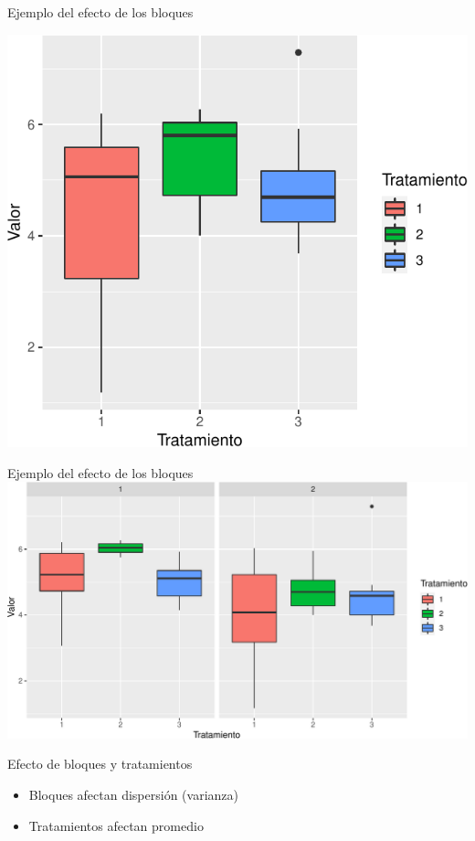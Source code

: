 \documentclass[
  11pt,
  ignorenonframetext,
]{beamer}
\begin{document}
\begin{frame}{Ejemplo del efecto de los bloques}
\protect\hypertarget{ejemplo-del-efecto-de-los-bloques}{}
\begin{center}\includegraphics{Relacion-diseno-analisis_files/figure-beamer/unnamed-chunk-1-1} \end{center}
\end{frame}

\begin{frame}{Ejemplo del efecto de los bloques}
\protect\hypertarget{ejemplo-del-efecto-de-los-bloques-1}{}
\includegraphics{Relacion-diseno-analisis_files/figure-beamer/unnamed-chunk-2-1.pdf}
\end{frame}

\begin{frame}{Efecto de bloques y tratamientos}
\protect\hypertarget{efecto-de-bloques-y-tratamientos}{}
\begin{itemize}
\item
  Bloques afectan dispersión (varianza)
\item
  Tratamientos afectan promedio
\end{itemize}
\end{frame}
\end{document}
